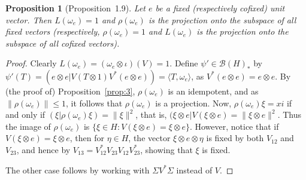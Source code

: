 \documentclass[a4paper,12pt]{article}
\theoremstyle{plain}
\newtheorem{proposition}{Proposition}[section]
\theoremstyle{definition}
\newcommand{\ip}[2]{{\langle {#1} , {#2} \rangle}}
\newcommand{\mc}{\mathcal}
\begin{document}
\begin{proposition}[Proposition~1.9]
Let $e$ be a fixed (respectively cofixed) unit vector.  Then
$L(\omega_e)=1$ and $\rho(\omega_e)$ is the projection onto the subspace
of all fixed vectors (respectively, $\rho(\omega_e)=1$ and $L(\omega_e)$
is the projection onto the subspace of all cofixed vectors).
\end{proposition}
\begin{proof}
Clearly $L(\omega_e) = (\omega_e\otimes\iota)(V) = 1$.  Define
$\psi'\in\mc B(H)_*$ by $\psi'(T) = (e\otimes e|
V(T\otimes 1)V^*(e\otimes e)) = \ip{T}{\omega_e}$, as
$V^*(e\otimes e)=e\otimes e$.
By (the proof of) Proposition~\ref{prop:3}, $\rho(\omega_e)$ is
an idempotent, and as $\|\rho(\omega_e)\|\leq 1$, it follows that
$\rho(\omega_e)$ is a projection.  Now, $\rho(\omega_e)\xi=xi$
if and only if $(\xi|\rho(\omega_e)\xi)=\|\xi\|^2$, that is,
$(\xi\otimes e|V(\xi\otimes e) = \|\xi\otimes e\|^2$.  Thus
the image of $\rho(\omega_e)$ is $\{ \xi\in H : V(\xi\otimes e)=
\xi\otimes e \}$.  However, notice that if $V(\xi\otimes e)=\xi\otimes e$,
then for $\eta\in H$, the vector $\xi\otimes e\otimes\eta$ is fixed by
both $V_{12}$ and $V_{23}$, and hence by $V_{13} = V_{12}^* V_{23} V_{12}
V_{23}^*$, showing that $\xi$ is fixed.

The other case follows by working with $\Sigma V^* \Sigma$ instead of $V$.
\end{proof}
\end{document}
